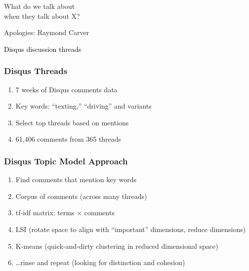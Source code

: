 \documentclass{beamer}
\begin{document}
\begin{frame}
\begin{center}
{\Huge What do we talk about \\ [15pt] when they talk about X?} 
\end{center}
\hfill Apologies: Raymond Carver \\
\end{frame}

{
\begin{frame}
\textcolor{black} {
\vfill \hfill \Large Disqus discussion threads}
\end{frame}
}

\begin{frame}\frametitle{Disqus Threads}
\begin{center}
{\Large 
\begin{enumerate}
\item 7 weeks of Disqus comments data
\item Key words: ``texting,'' ``driving'' and variants
\item Select top threads based on mentions
\item 61,406 comments from 365 threads
\end{enumerate}
}
\end{center}
\end{frame}

\begin{frame}\frametitle{Disqus Topic Model Approach}
\begin{center}
{\Large 
\begin{enumerate}
\item Find comments that mention key words
\item Corpus of comments (across many threads)
\item tf-idf matrix: terms $\times$ comments
\item LSI (rotate space to align with ``important'' dimensions, reduce dimensions)
\item K-means (quick-and-dirty clustering in reduced dimensional space)
\item \ldots rinse and repeat (looking for distinction and cohesion)
\end{enumerate}
}
\end{center}
\end{frame}
\end{document}

